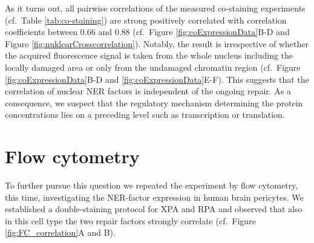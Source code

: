 \noindent As it turns out, all pairwise correlations of the measured co-staining experiments (cf.\ Table \ref{tab:co-staining}) are strong positively correlated with correlation coefficients between 0.66 and 0.88 (cf.\ Figure \ref{fig:coExpressionData}B-D and Figure \ref{fig:nuklearCrosscorrelation}). Notably, the result is irrespective of whether the acquired fluorescence signal is taken from the whole nucleus including the locally damaged area or only from the undamaged chromatin region (cf.\ Figure \ref{fig:coExpressionData}B-D and \ref{fig:coExpressionData}E-F). This suggests that the correlation of nuclear NER factors is independent of the ongoing repair. As a consequence, we suspect that the regulatory mechanism determining the protein concentrations lies on a preceding level such as transcription or translation.\\  



\section{Flow cytometry}

To further pursue this question we repeated the experiment by flow cytometry, this time, investigating the NER-factor expression in human brain pericytes. We established a double-staining protocol for XPA and RPA and observed that also in this cell type the two repair factors strongly correlate (cf.\ Figure \ref{fig:FC_correlation}A and B).    

 

